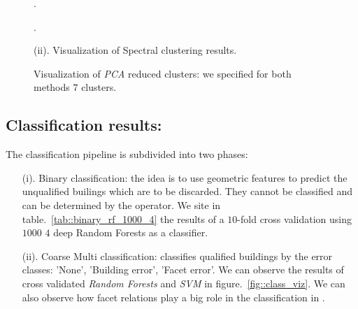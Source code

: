 \documentclass[a4paper, 11pt]{article}
\begin{document}
\begin{figure}[H]
{{\begin{subfloatrow}[2]
{					}
					{
						\caption{.}\label{fig::spectral_1}
					}
					{
						\caption{.}\label{fig::spectral_2}
					}
				\end{subfloatrow}
			}
			{
				\caption*{(ii). Visualization of Spectral clustering results.}
			}
		}
		{
			\caption{\label{fig::clust_viz} Visualization of \textit{PCA} reduced clusters: we specified for both methods $7$ clusters.}
		}
	\end{figure}

	\subsection{Classification results:}

	The classification pipeline is subdivided into two phases:

	\begin{itemize}
		\item[(i).] Binary classification: the idea is to use geometric features to predict the unqualified builings which are to be discarded. They cannot be classified and can be determined by the operator. We site in table.~\ref{tab::binary_rf_1000_4} the results of a $10$-fold cross validation using $1000$ $4$ deep Random Forests as a classifier.

		\item[(ii).] Coarse Multi classification: classifies qualified buildings by the error classes: 'None', 'Building error', 'Facet error'. We can observe the results of cross validated \textit{Random Forests} and \textit{SVM} in figure.~\ref{fig::class_viz}. We can also observe how facet relations play a big role in the classification in .
	\end{itemize}
\end{document}

